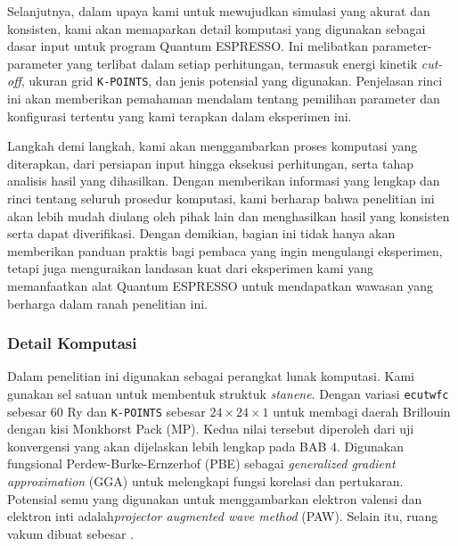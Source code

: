 Selanjutnya, dalam upaya kami untuk mewujudkan simulasi yang akurat dan konsisten, kami akan memaparkan detail komputasi yang digunakan sebagai dasar input untuk program Quantum ESPRESSO. Ini melibatkan parameter-parameter yang terlibat dalam setiap perhitungan, termasuk energi kinetik \textit{cut-off}, ukuran grid \texttt{K-POINTS}, dan jenis potensial yang digunakan. Penjelasan rinci ini akan memberikan pemahaman mendalam tentang pemilihan parameter dan konfigurasi tertentu yang kami terapkan dalam eksperimen ini.

Langkah demi langkah, kami akan menggambarkan proses komputasi yang diterapkan, dari persiapan input hingga eksekusi perhitungan, serta tahap analisis hasil yang dihasilkan. Dengan memberikan informasi yang lengkap dan rinci tentang seluruh prosedur komputasi, kami berharap bahwa penelitian ini akan lebih mudah diulang oleh pihak lain dan menghasilkan hasil yang konsisten serta dapat diverifikasi. Dengan demikian, bagian ini tidak hanya akan memberikan panduan praktis bagi pembaca yang ingin mengulangi eksperimen, tetapi juga menguraikan landasan kuat dari eksperimen kami yang memanfaatkan alat Quantum ESPRESSO untuk mendapatkan wawasan yang berharga dalam ranah penelitian ini. 

\vspace{3mm}

\subsubsection{Detail Komputasi}
Dalam penelitian ini digunakan \qe  sebagai perangkat lunak komputasi\citep{Giannozzi_2009}. Kami gunakan sel satuan untuk membentuk struktuk \textit{stanene}. Dengan variasi \texttt{ecutwfc} sebesar 60 Ry dan \texttt{K-POINTS} sebesar $24\times24\times1$ untuk membagi daerah Brillouin dengan kisi Monkhorst Pack (MP)\citep{MP}. Kedua nilai tersebut diperoleh dari uji konvergensi yang akan dijelaskan lebih lengkap pada BAB 4. Digunakan fungsional Perdew-Burke-Ernzerhof (PBE)\cite{PBE} sebagai \textit{generalized gradient approximation} (GGA) untuk melengkapi fungsi korelasi dan pertukaran. Potensial semu yang digunakan untuk menggambarkan elektron valensi dan elektron inti adalah\textit{projector augmented wave method} (PAW)\citep{PAW}. Selain itu, ruang vakum dibuat sebesar .

